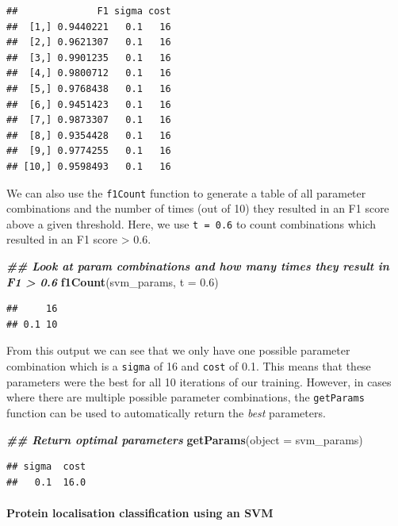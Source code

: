 \documentclass[9pt,a4paper,]{extarticle}
\newenvironment{Shaded}{\begin{snugshade}}{\end{snugshade}}
\newcommand{\AttributeTok}[1]{\textcolor[rgb]{0.13,0.29,0.53}{#1}}
\newcommand{\DocumentationTok}[1]{\textcolor[rgb]{0.56,0.35,0.01}{\textbf{\textit{#1}}}}
\newcommand{\FloatTok}[1]{\textcolor[rgb]{0.00,0.00,0.81}{#1}}
\newcommand{\FunctionTok}[1]{\textcolor[rgb]{0.13,0.29,0.53}{\textbf{#1}}}
\newcommand{\NormalTok}[1]{#1}
\begin{document}
\begin{verbatim}
##              F1 sigma cost
##  [1,] 0.9440221   0.1   16
##  [2,] 0.9621307   0.1   16
##  [3,] 0.9901235   0.1   16
##  [4,] 0.9800712   0.1   16
##  [5,] 0.9768438   0.1   16
##  [6,] 0.9451423   0.1   16
##  [7,] 0.9873307   0.1   16
##  [8,] 0.9354428   0.1   16
##  [9,] 0.9774255   0.1   16
## [10,] 0.9598493   0.1   16
\end{verbatim}

We can also use the \texttt{f1Count} function to generate a table of all parameter
combinations and the number of times (out of 10) they resulted in an F1 score
above a given threshold. Here, we use \texttt{t\ =\ 0.6} to count combinations which
resulted in an F1 score \textgreater{} 0.6.

\begin{Shaded}
\begin{Highlighting}[]
\DocumentationTok{\#\# Look at param combinations and how many times they result in F1 \textgreater{} 0.6}
\FunctionTok{f1Count}\NormalTok{(svm\_params, }\AttributeTok{t =} \FloatTok{0.6}\NormalTok{)}
\end{Highlighting}
\end{Shaded}

\begin{verbatim}
##     16
## 0.1 10
\end{verbatim}

From this output we can see that we only have one possible parameter combination
which is a \texttt{sigma} of 16 and \texttt{cost} of 0.1. This means that these parameters were
the best for all 10 iterations of our training. However, in cases where there
are multiple possible parameter combinations, the \texttt{getParams} function can be
used to automatically return the \emph{best} parameters.

\begin{Shaded}
\begin{Highlighting}[]
\DocumentationTok{\#\# Return optimal parameters}
\FunctionTok{getParams}\NormalTok{(}\AttributeTok{object =}\NormalTok{ svm\_params)}
\end{Highlighting}
\end{Shaded}

\begin{verbatim}
## sigma  cost 
##   0.1  16.0
\end{verbatim}

\paragraph{Protein localisation classification using an SVM}\label{protein-localisation-classification-using-an-svm}
\end{document}
